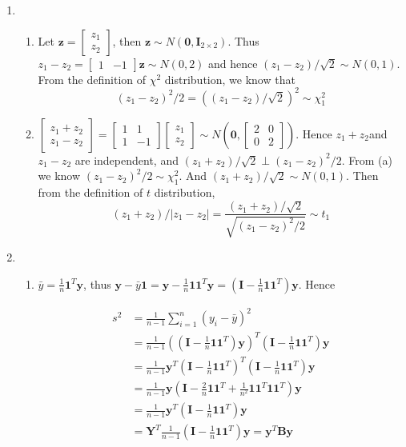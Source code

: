 \documentclass{article}
\begin{document}
\begin{enumerate}[leftmargin = 0 em, label = \arabic*., font = \bfseries]
\item 
\begin{enumerate}
	\item 
	Let $\bm z = \begin{bmatrix}
		z_1 \\ z_2
	\end{bmatrix}$, then $\bm z \sim N(\bm 0, \bm I_{2\times 2})$. Thus $z_1 - z_2  = \begin{bmatrix}
		1 & -1
	\end{bmatrix}\bm z\sim N(0,2)$ and hence $(z_1 - z_2)/\sqrt{2} \sim N(0,1)$. From the definition of $\chi^2$ distribution, we know that 
	\[(z_1 - z_2)^2 / 2 = \left((z_1 - z_2)/\sqrt{2}\right)^2 \sim \chi_1^2 \]

	\item 
	$\begin{bmatrix}
		z_1 + z_2 \\
		z_1 - z_2
	\end{bmatrix} = \begin{bmatrix}
		1 & 1\\
		1 & -1
	\end{bmatrix} \begin{bmatrix}
		z_1 \\ z_2
	\end{bmatrix} \sim N(\bm 0, \begin{bmatrix}
		2 & 0\\
		0 & 2
	\end{bmatrix})$. Hence $z_1 + z_2 $and $z_1 - z_2$ are independent, and $(z_1 + z_2)/\sqrt{2} \perp (z_1 - z_2)^2/2$. From (a) we know $(z_1 - z_2)^2 / 2 \sim \chi^2_1$. And $(z_1 + z_2)/\sqrt{2} \sim N(0,1)$. Then from the definition of $t$ distribution, 
	\[(z_1 + z_2)/|z_1 - z_2| = \frac{(z_1 + z_2)/\sqrt{2}}{\sqrt{(z_1 - z_2)^2/2}} \sim t_1\]
\end{enumerate}

\item 
\begin{enumerate}
	\item 
	$\bar{y} = \frac{1}{n} \bm 1^T \bm y$, thus $\bm y - \bar{y}\bm 1 = \bm y - \frac{1}{n} \bm 1 \bm 1^T \bm y = (\bm I - \frac{1}{n} \bm 1 \bm 1^T)\bm y$. Hence

\begin{align*}
s^2 &= \frac{1}{n-1} \sum_{i = 1}^n (y_i - \bar{y})^2 \\
& = \frac{1}{n-1}((\bm I - \frac{1}{n} \bm 1 \bm 1^T)\bm y)^T (\bm I - \frac{1}{n} \bm 1 \bm 1^T)\bm y\\
& = \frac{1}{n-1} \bm y^T (\bm I - \frac{1}{n}\bm 1 \bm 1^T)^T(\bm I - \frac{1}{n}\bm 1 \bm 1^T) \bm y\\
&  = \frac{1}{n-1} \bm y (\bm I - \frac{2}{n} \bm 1 \bm 1^T + \frac{1}{n^2} \bm 1 \bm 1^T \bm 1 \bm 1^T)\bm y\\
&  =\frac{1}{n-1}\bm y^T (\bm I - \frac{1}{n} \bm 1 \bm 1^T) \bm y\\
& = \bm Y^T \frac{1}{n-1}(\bm I - \frac{1}{n} \bm 1 \bm 1^T) \bm y = \bm y^T \bm B \bm y
\end{align*}


\end{enumerate}
\end{enumerate}
\end{document}
